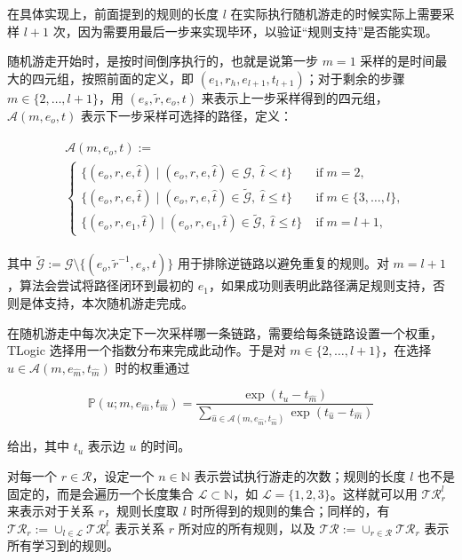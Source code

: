 \documentclass[a4paper, AutoFakeBold]{article}
\begin{document}
在具体实现上，前面提到的规则的长度 $l$ 在实际执行随机游走的时候实际上需要采样 $l+1$ 次，因为需要用最后一步来实现毕环，以验证“规则支持”是否能实现。

随机游走开始时，是按时间倒序执行的，也就是说第一步 $m=1$ 采样的是时间最大的四元组，按照前面的定义，即 $(e_1,r_h,e_{l+1},t_{l+1})$；对于剩余的步骤 $m\in\{2,\dots,l+1\}$，用 $(e_s,{\tilde r},e_o,t)$ 来表示上一步采样得到的四元组，${\mathcal A}(m,e_o, t)$ 表示下一步采样可选择的路径，定义：

\begin{equation}
\begin{aligned}
	\begin{split}
		&\mathcal{A}(m, e_o, t) := \\
		&\begin{cases}
			\{(e_o, r, e, \hat{t}) \mid (e_o, r, e, \hat{t}) \in \mathcal{G},\; \hat{t} < t\} &\;\text{if}\; m = 2,\\
			\{(e_o, r, e, \hat{t}) \mid (e_o, r, e, \hat{t}) \in \tilde{\mathcal{G}},\; \hat{t} \leq t\} &\;\text{if}\; m \in \{3, \dots, l\},\\
			\{(e_o, r, e_1, \hat{t}) \mid (e_o, r, e_1, \hat{t}) \in \tilde{\mathcal{G}},\; \hat{t} \leq t\} &\;\text{if}\; m = l+1,
		\end{cases}
	\end{split}
\end{aligned}
\end{equation}

其中 $\tilde{\mathcal{G}} := \mathcal{G}\setminus \{(e_o, \tilde{r}^{-1}, e_s, t)\}$ 用于排除逆链路以避免重复的规则。对 $m=l+1$，算法会尝试将路径闭环到最初的 $e_1$，如果成功则表明此路径满足规则支持，否则是体支持，本次随机游走完成。

在随机游走中每次决定下一次采样哪一条链路，需要给每条链路设置一个权重，TLogic 选择用一个指数分布来完成此动作。于是对 $m \in \{2, \dots, l+1\}$，在选择 $u \in \mathcal{A}\left(m,e_{\hat{m}}, t_{\hat{m}}\right)$ 时的权重通过

\begin{equation}
	\mathbb{P}(u; m, e_{\hat{m}}, t_{\hat{m}}) = \frac{\exp(t_u - t_{\hat{m}})}{\sum\limits_{\hat{u} \in \mathcal{A}\left(m, e_{\hat{m}}, t_{\hat{m}}\right)}\exp(t_{\hat{u}} - t_{\hat{m}})}
\end{equation}


给出，其中 $t_u$ 表示边 $u$ 的时间。

对每一个 $r\in{\mathcal R}$，设定一个 $n\in{\mathbb N}$ 表示尝试执行游走的次数；规则的长度 $l$ 也不是固定的，而是会遍历一个长度集合 ${\mathcal L}\subset{\mathbb N}$，如 ${\mathcal L}=\{1,2,3\}$。这样就可以用 ${\mathcal {TR}}_r^l$ 来表示对于关系 $r$，规则长度取 $l$ 时所得到的规则的集合；同样的，有 $\mathcal{TR}_r := \cup_{l \in \mathcal{L}} \mathcal{TR}_r^l$ 表示关系 $r$ 所对应的所有规则，以及 $\mathcal{TR} := \cup_{r \in \mathcal{R}} \mathcal{TR}_r$ 表示所有学习到的规则。
\end{document}
